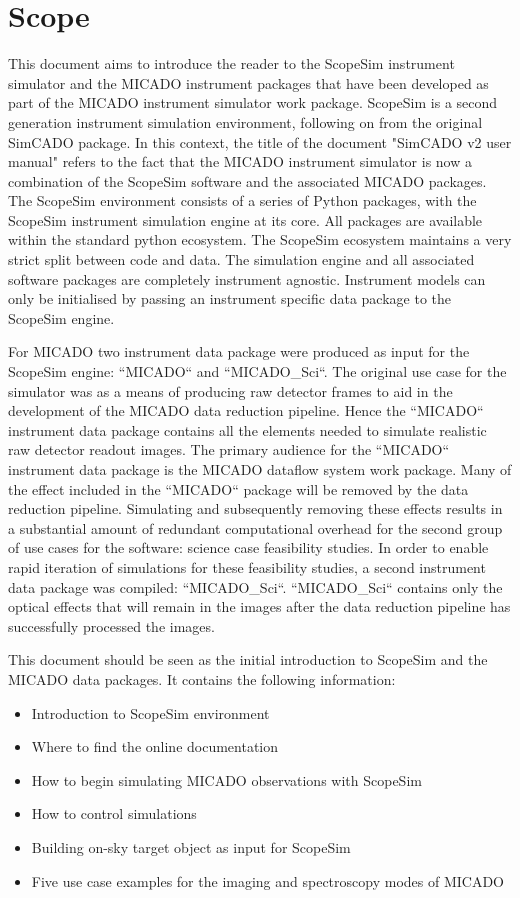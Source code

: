 \section{Scope}
\label{sec:introduction}

This document aims to introduce the reader to the ScopeSim instrument simulator and the MICADO instrument packages that have been developed as part of the MICADO instrument simulator work package.
ScopeSim is a second generation instrument simulation environment, following on from the original SimCADO package.
In this context, the title of the document "SimCADO v2 user manual" refers to the fact that the MICADO instrument simulator is now a combination of the ScopeSim software and the associated MICADO packages.
The ScopeSim environment consists of a series of Python packages, with the ScopeSim instrument simulation engine at its core.
All packages are available within the standard python ecosystem.
The ScopeSim ecosystem maintains a very strict split between code and data.
The simulation engine and all associated software packages are completely instrument agnostic.
Instrument models can only be initialised by passing an instrument specific data package to the ScopeSim engine.

For MICADO two instrument data package were produced as input for the ScopeSim engine: ``MICADO`` and ``MICADO_Sci``.
The original use case for the simulator was as a means of producing raw detector frames to aid in the development of the MICADO data reduction pipeline.
Hence the ``MICADO`` instrument data package contains all the elements needed to simulate realistic raw detector readout images.
The primary audience for the ``MICADO`` instrument data package is the MICADO dataflow system work package.
Many of the effect included in the ``MICADO`` package will be removed by the data reduction pipeline.
Simulating and subsequently removing these effects results in a substantial amount of redundant computational overhead for the second group of use cases for the software: science case feasibility studies.
In order to enable rapid iteration of simulations for these feasibility studies, a second instrument data package was compiled: ``MICADO_Sci``.
``MICADO_Sci`` contains only the optical effects that will remain in the images after the data reduction pipeline has successfully processed the images.

This document should be seen as the initial introduction to ScopeSim and the MICADO data packages.
It contains the following information:
\begin{itemize}
\item Introduction to ScopeSim environment
\item Where to find the online documentation
\item How to begin simulating MICADO observations with ScopeSim
\item How to control simulations
\item Building on-sky target object as input for ScopeSim
\item Five use case examples for the imaging and spectroscopy modes of MICADO
\end{itemize}

